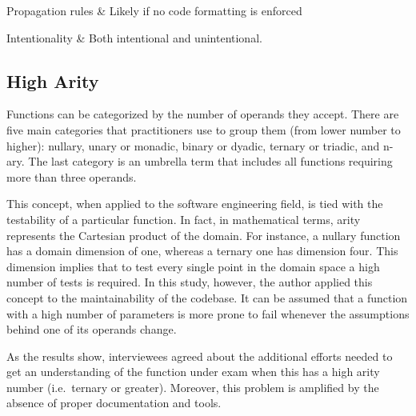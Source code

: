 \begin{table}[!htbp]
\begin{tabu}

			Propagation rules & Likely if no code formatting is enforced\\
			\hline

			Intentionality & Both intentional and unintentional. \\
			\hline

		\end{tabu}
		\label{tab:res-complex-statements}
		\caption[Complex statements TD item specification]{Complex statements Technical Debt item specification according to guidelines proposed by \cite{mapping_study_td}.}
	\end{table}


	\subsection{High Arity}

    Functions can be categorized by the number of operands they accept. There are five main categories that practitioners use to group them (from lower number to higher): nullary, unary or monadic, binary or dyadic, ternary or triadic, and n-ary. The last category is an umbrella term that includes all functions requiring more than three operands.

    This concept, when applied to the software engineering field, is tied with the testability of a particular function. In fact, in mathematical terms, arity represents the Cartesian product of the domain. For instance, a nullary function has a domain dimension of one, whereas a ternary one has dimension four. This dimension implies that to test every single point in the domain space a high number of tests is required. In this study, however, the author applied this concept to the maintainability of the codebase. It can be assumed that a function with a high number of parameters is more prone to fail whenever the assumptions behind one of its operands change.

    As the results show, interviewees agreed about the additional efforts needed to get an understanding of the function under exam when this has a high arity number (i.e.\ ternary or greater). Moreover, this problem is amplified by the absence of proper documentation and tools.

